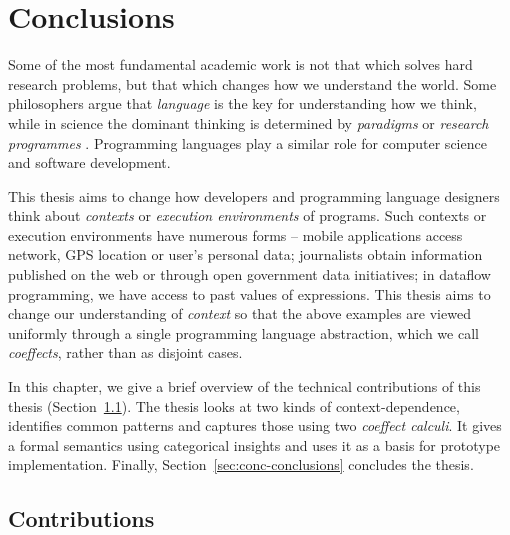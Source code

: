 \chapter{Conclusions}
\label{ch:conclusions}

Some of the most fundamental academic work is not that which solves hard research problems, but
that which changes how we understand the world. Some philosophers argue that \emph{language} is the
key for understanding how we think, while in science the dominant thinking is determined by
\emph{paradigms} \cite{philosophy-kuhn} or \emph{research programmes} \cite{philosophy-lakatos}.
Programming languages play a similar role for computer science and software development.

This thesis aims to change how developers and programming language designers think about
\emph{contexts} or \emph{execution environments} of programs. Such contexts or execution environments
have numerous forms -- mobile applications access network, GPS location or user's personal data;
journalists obtain information published on the web or through open government data initiatives;
in dataflow programming, we have access to past values of expressions.
This thesis aims to change our understanding of \emph{context} so that the above examples are
viewed uniformly through a single programming language abstraction, which we call \emph{coeffects},
rather than as disjoint cases.

In this chapter, we give a brief overview of the technical contributions of this thesis
(Section~\ref{sec:conc-summary}). The thesis looks at two kinds of context-dependence, identifies
common patterns and captures those using two \emph{coeffect calculi}. It gives a formal semantics
using categorical insights and uses it as a basis for prototype implementation. Finally,
Section~\ref{sec:conc-conclusions} concludes the thesis.


%
%

\section{Contributions}
\label{sec:conc-summary}

